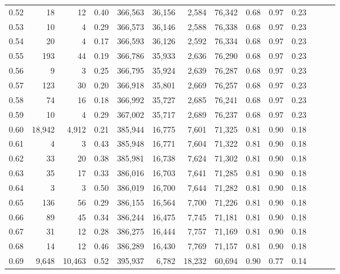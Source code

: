\begin{tabular}{rrrrrrrrrrrrrr}
0.52 &      18 &      12 &  0.40 &  366,563 &   36,156 &   2,584 &  76,342 &  0.68 &  0.97 &      0.23 \\
0.53 &      10 &       4 &  0.29 &  366,573 &   36,146 &   2,588 &  76,338 &  0.68 &  0.97 &      0.23 \\
0.54 &      20 &       4 &  0.17 &  366,593 &   36,126 &   2,592 &  76,334 &  0.68 &  0.97 &      0.23 \\
0.55 &     193 &      44 &  0.19 &  366,786 &   35,933 &   2,636 &  76,290 &  0.68 &  0.97 &      0.23 \\
0.56 &       9 &       3 &  0.25 &  366,795 &   35,924 &   2,639 &  76,287 &  0.68 &  0.97 &      0.23 \\
0.57 &     123 &      30 &  0.20 &  366,918 &   35,801 &   2,669 &  76,257 &  0.68 &  0.97 &      0.23 \\
0.58 &      74 &      16 &  0.18 &  366,992 &   35,727 &   2,685 &  76,241 &  0.68 &  0.97 &      0.23 \\
0.59 &      10 &       4 &  0.29 &  367,002 &   35,717 &   2,689 &  76,237 &  0.68 &  0.97 &      0.23 \\
0.60 &  18,942 &   4,912 &  0.21 &  385,944 &   16,775 &   7,601 &  71,325 &  0.81 &  0.90 &      0.18 \\
0.61 &       4 &       3 &  0.43 &  385,948 &   16,771 &   7,604 &  71,322 &  0.81 &  0.90 &      0.18 \\
0.62 &      33 &      20 &  0.38 &  385,981 &   16,738 &   7,624 &  71,302 &  0.81 &  0.90 &      0.18 \\
0.63 &      35 &      17 &  0.33 &  386,016 &   16,703 &   7,641 &  71,285 &  0.81 &  0.90 &      0.18 \\
0.64 &       3 &       3 &  0.50 &  386,019 &   16,700 &   7,644 &  71,282 &  0.81 &  0.90 &      0.18 \\
0.65 &     136 &      56 &  0.29 &  386,155 &   16,564 &   7,700 &  71,226 &  0.81 &  0.90 &      0.18 \\
0.66 &      89 &      45 &  0.34 &  386,244 &   16,475 &   7,745 &  71,181 &  0.81 &  0.90 &      0.18 \\
0.67 &      31 &      12 &  0.28 &  386,275 &   16,444 &   7,757 &  71,169 &  0.81 &  0.90 &      0.18 \\
0.68 &      14 &      12 &  0.46 &  386,289 &   16,430 &   7,769 &  71,157 &  0.81 &  0.90 &      0.18 \\
0.69 &   9,648 &  10,463 &  0.52 &  395,937 &    6,782 &  18,232 &  60,694 &  0.90 &  0.77 &      0.14 \\

\end{tabular}
